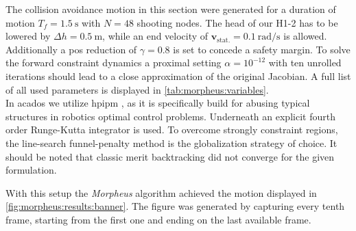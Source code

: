The collision avoidance motion in this section were generated for a duration of motion $T_f=\SI{1.5}{\second}$ with $N=48$ shooting nodes.
The head of our H1-2 has to be lowered by $\Delta h = \SI{0.5}{\meter}$, while an end velocity of $\bm v_\text{stat.}=\SI{0.1}{\radian \per \second}$ is allowed.
Additionally a \acrshort{pos} reduction of $\gamma=0.8$ is set to concede a safety margin.
To solve the forward constraint dynamics a proximal setting $\alpha=10^{-12}$ with ten unrolled iterations should lead to a close approximation of the original Jacobian.
A full list of all used parameters is displayed in \cref{tab:morpheus:variables}.
\\
In acados we utilize \acrshort{hpipm} \cite{frison_hpipm_2020}, as it is specifically build for abusing typical structures in robotics optimal control problems.
Underneath an explicit fourth order Runge-Kutta integrator is used.
To overcome strongly constraint regions, the line-search funnel-penalty method \cite{kiessling_2025} is the globalization strategy of choice.
It should be noted that classic merit backtracking did not converge for the given formulation.
\par
With this setup the \textit{Morpheus} algorithm achieved the motion displayed in \cref{fig:morpheus:results:banner}.
The figure was generated by capturing every tenth frame, starting from the first one and ending on the last available frame.
